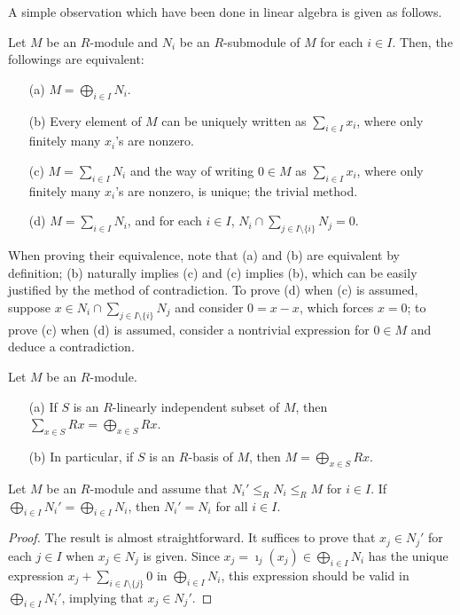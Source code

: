 A simple observation which have been done in linear algebra is given as follows.
\begin{obs}
    Let $M$ be an $R$-module and $N_i$ be an $R$-submodule of $M$ for each $i\in I$.
    Then, the followings are equivalent:
    \begin{enumerate}
        \item[(a)]
        {
            $M=\bigoplus_{i\in I} N_i$.
        }
        \item[(b)]
        {
            Every element of $M$ can be uniquely written as $\sum_{i\in I} x_i$, where only finitely many $x_i$'s are nonzero.
        }
        \item[(c)]
        {
            $M=\sum_{i\in I}N_i$ and the way of writing $0\in M$ as $\sum_{i\in I} x_i$, where only finitely many $x_i$'s are nonzero, is unique; the trivial method.
        }
        \item[(d)]
        {
            $M=\sum_{i\in I}N_i$, and for each $i\in I$, $N_i\cap\sum_{j\in I\setminus\{i\}}N_j=0$.
        }
    \end{enumerate}
    When proving their equivalence, note that (a) and (b) are equivalent by definition; (b) naturally implies (c) and (c) implies (b), which can be easily justified by the method of contradiction.
    To prove (d) when (c) is assumed, suppose $x\in N_i\cap\sum_{j\in I\setminus\{i\}}N_j$ and consider $0=x-x$, which forces $x=0$; to prove (c) when (d) is assumed, consider a nontrivial expression for $0\in M$ and deduce a contradiction.
\end{obs}

\begin{obs}
    Let $M$ be an $R$-module.
    \begin{enumerate}
        \item[(a)]
        {
            If $S$ is an $R$-linearly independent subset of $M$, then $\sum_{x\in S} Rx=\bigoplus_{x\in S} Rx$.
        }
        \item[(b)]
        {
            In particular, if $S$ is an $R$-basis of $M$, then $M=\bigoplus_{x\in S} Rx$.
        }
    \end{enumerate}
\end{obs}

\begin{prop}
    Let $M$ be an $R$-module and assume that $N_i'\leq_R N_i\leq_R M$ for $i\in I$.
    If $\bigoplus_{i\in I} N_i'=\bigoplus_{i\in I} N_i$, then $N_i'=N_i$ for all $i\in I$.
\end{prop}
\begin{proof}
    The result is almost straightforward.
    It suffices to prove that $x_j\in N_j'$ for each $j\in I$ when $x_j\in N_j$ is given.
    Since $x_j=\imath_j(x_j)\in\bigoplus_{i\in I} N_i$ has the unique expression $x_j+\sum_{i\in I\setminus\{j\}}0$ in $\bigoplus_{i\in I}N_i$, this expression should be valid in $\bigoplus_{i\in I}N_i'$, implying that $x_j\in N_j'$.
\end{proof}

